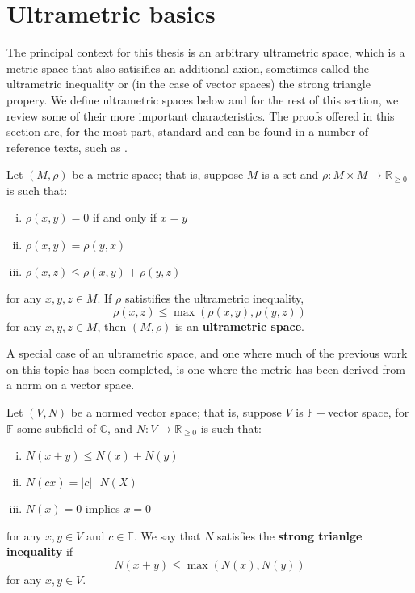 \section{Ultrametric basics}

The principal context for this thesis is an arbitrary ultrametric space, which is a metric space that also satisifies an additional axion, sometimes called the ultrametric inequality or (in the case of vector spaces) the strong triangle propery. We define  ultrametric spaces below and for the rest of this section, we review some of their more important characteristics. The proofs offered in this section are, for the most part, standard and can be found in a number of reference texts, such as \cite{ar}.\\

\begin{definition}
	 Let $(M, \rho)$ be a metric space; that is, suppose $M$ is a set and $\rho: M \times M \rightarrow \mathbb{R}_{\geq 0}$ is such that:
	\begin{enumerate}[(i)]
		\item $\rho(x,y) = 0$ if and only if $x=y$
		\item $\rho(x,y) = \rho(y,x)$
		\item $\rho(x,z) \leq \rho(x,y) + \rho(y,z)$
	\end{enumerate}
	for any $x,y,z \in M$. If $\rho$ satistifies the ultrametric inequality,	
		\[ \rho(x,z) \leq \max{(\rho(x,y), \rho(y,z))}\]
for any $x,y,z \in M$, then $(M, \rho)$ is an \textbf{ultrametric space}.
\end{definition}

A special case of an ultrametric space, and one where much of the previous work on this topic has been completed, is one where the metric has been derived from a norm on a vector space. \\

\begin{definition}
	 Let $(V, N)$ be a normed vector space; that is, suppose $V$ is $\mathbb{F-}$vector space, for $\mathbb{F}$ some subfield of $\mathbb{C}$, and $N: V \rightarrow \mathbb{R}_{\geq 0}$  is such that:
	\begin{enumerate}[(i)]
		\item $N(x +y ) \leq N(x) + N(y)$
		\item $N(cx) = \lvert c \rvert \text{ } N(X)$
		\item $N(x) = 0$ implies $x=0$
	\end{enumerate}
	for any $x,y \in V$ and $c \in \mathbb{F}$. We say that $N$ satisfies the \textbf{strong trianlge inequality} if
	\[ N(x + y) \leq \max(N(x), N(y)) \]
	for any $x,y \in V$.
\end{definition}

